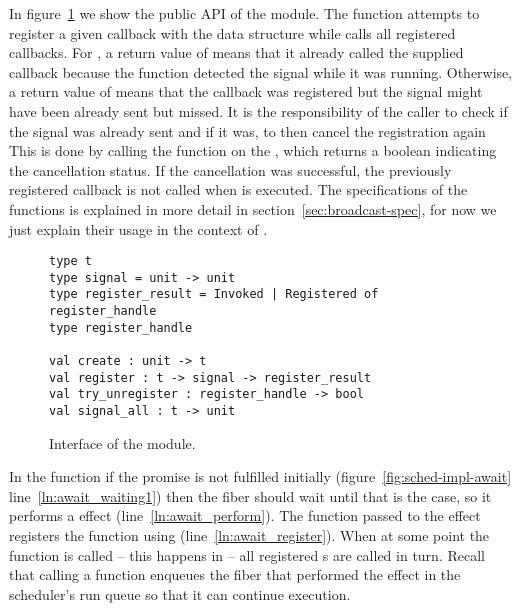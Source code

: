 In figure~\ref{fig:sched-impl-broadcast} we show the public API of the  module.
The  function attempts to register a given callback with the data structure while  calls all registered callbacks.
For , a return value of  means that it already called the supplied callback because the function detected the signal while it was running.
Otherwise, a return value of  means that the callback was registered but the signal might have been already sent but missed.
It is the responsibility of the caller to check if the signal was already sent and if it was, to then cancel the registration again
This is done by calling the  function on the , which returns a boolean indicating the cancellation status.
If the cancellation was successful, the previously registered callback is not called when  is executed.
The specifications of the functions is explained in more detail in section~\ref{sec:broadcast-spec}, for now we just explain their usage in the context of .

\begin{figure}[ht]
    \begin{verbatim}
type t
type signal = unit -> unit
type register_result = Invoked | Registered of register_handle
type register_handle

val create : unit -> t
val register : t -> signal -> register_result
val try_unregister : register_handle -> bool
val signal_all : t -> unit
  \end{verbatim}
    \caption{Interface of the  module.}
    \label{fig:sched-impl-broadcast}
\end{figure}

In the  function if the promise is not fulfilled initially (figure~\ref{fig:sched-impl-await} line~\ref{ln:await_waiting1})
then the fiber should wait until that is the case, so it performs a \esuspend{} effect (line~\ref{ln:await_perform}).
The  function passed to the effect registers the  function using  (line~\ref{ln:await_register}).
When at some point the  function is called -- this happens in  -- all registered s are called in turn.
Recall that calling a  function enqueues the fiber that performed the \esuspend{} effect in the scheduler's run queue so that it can continue execution.

